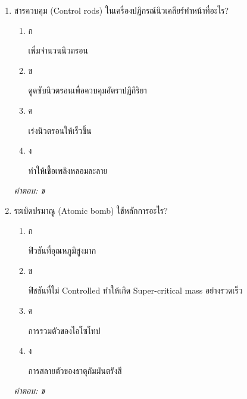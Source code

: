 \documentclass[12pt]{article}
\begin{document}
\begin{enumerate}[label=\arabic*., itemsep=0.5\baselineskip, topsep=0.5\baselineskip, leftmargin=*]
\item สารควบคุม (Control rods) ในเครื่องปฏิกรณ์นิวเคลียร์ทำหน้าที่อะไร?
\begin{enumerate}[label=\alph*)., itemsep=0.3\baselineskip, topsep=0.3\baselineskip]
\item ก\ 
\begin{minipage}[t]{0.9\linewidth}
\raggedright เพิ่มจำนวนนิวตรอน
\end{minipage}
\item ข\ 
\begin{minipage}[t]{0.9\linewidth}
\raggedright ดูดซับนิวตรอนเพื่อควบคุมอัตราปฏิกิริยา
\end{minipage}
\item ค\ 
\begin{minipage}[t]{0.9\linewidth}
\raggedright เร่งนิวตรอนให้เร็วขึ้น
\end{minipage}
\item ง\ 
\begin{minipage}[t]{0.9\linewidth}
\raggedright ทำให้เชื้อเพลิงหลอมละลาย
\end{minipage}
\end{enumerate}
\vspace{-0.3\baselineskip}
\begin{small}
\textit{คำตอบ: ข}
\end{small}

\item ระเบิดปรมาณู (Atomic bomb) ใช้หลักการอะไร?
\begin{enumerate}[label=\alph*)., itemsep=0.3\baselineskip, topsep=0.3\baselineskip]
\item ก\ 
\begin{minipage}[t]{0.9\linewidth}
\raggedright ฟิวชันที่อุณหภูมิสูงมาก
\end{minipage}
\item ข\ 
\begin{minipage}[t]{0.9\linewidth}
\raggedright ฟิชชันที่ไม่ Controlled ทำให้เกิด Super-critical mass อย่างรวดเร็ว
\end{minipage}
\item ค\ 
\begin{minipage}[t]{0.9\linewidth}
\raggedright การรวมตัวของไอโซโทป
\end{minipage}
\item ง\ 
\begin{minipage}[t]{0.9\linewidth}
\raggedright การสลายตัวของธาตุกัมมันตรังสี
\end{minipage}
\end{enumerate}
\vspace{-0.3\baselineskip}
\begin{small}
\textit{คำตอบ: ข}
\end{small}


\end{enumerate}
\end{document}
